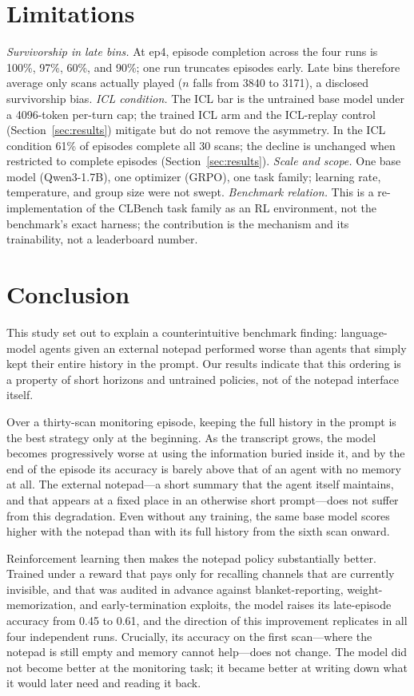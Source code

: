 \documentclass[11pt]{article}
\begin{document}
\section{Limitations}
\label{sec:limitations}

\emph{Survivorship in late bins.} At ep4, episode completion across the four runs
is 100\%, 97\%, 60\%, and 90\%; one run truncates episodes early. Late bins
therefore average only scans actually played ($n$ falls from 3840 to 3171), a
disclosed survivorship bias. \emph{ICL condition.} The ICL bar is the untrained
base model under a 4096-token per-turn cap; the trained ICL arm and the
ICL-replay control (Section~\ref{sec:results}) mitigate but do not remove the
asymmetry. In the ICL condition 61\% of episodes complete all 30 scans; the
decline is unchanged when restricted to complete episodes
(Section~\ref{sec:results}). \emph{Scale and scope.} One base model
(Qwen3-1.7B), one optimizer (GRPO), one task family; learning rate, temperature,
and group size were not swept. \emph{Benchmark relation.} This is a
re-implementation of the CLBench task family as an RL environment, not the
benchmark's exact harness; the contribution is the mechanism and its
trainability, not a leaderboard number.

\section{Conclusion}
\label{sec:conclusion}

This study set out to explain a counterintuitive benchmark finding: language-model
agents given an external notepad performed worse than agents that simply kept
their entire history in the prompt. Our results indicate that this ordering is a
property of short horizons and untrained policies, not of the notepad interface
itself.

Over a thirty-scan monitoring episode, keeping the full history in the prompt is
the best strategy only at the beginning. As the transcript grows, the model
becomes progressively worse at using the information buried inside it, and by the
end of the episode its accuracy is barely above that of an agent with no memory at
all. The external notepad---a short summary that the agent itself maintains, and
that appears at a fixed place in an otherwise short prompt---does not suffer from
this degradation. Even without any training, the same base model scores higher
with the notepad than with its full history from the sixth scan onward.

Reinforcement learning then makes the notepad policy substantially better.
Trained under a reward that pays only for recalling channels that are currently
invisible, and that was audited in advance against blanket-reporting,
weight-memorization, and early-termination exploits, the model raises its
late-episode accuracy from 0.45 to 0.61, and the direction of this improvement
replicates in all four independent runs. Crucially, its accuracy on the first
scan---where the notepad is still empty and memory cannot help---does not change.
The model did not become better at the monitoring task; it became better at
writing down what it would later need and reading it back.
\end{document}
